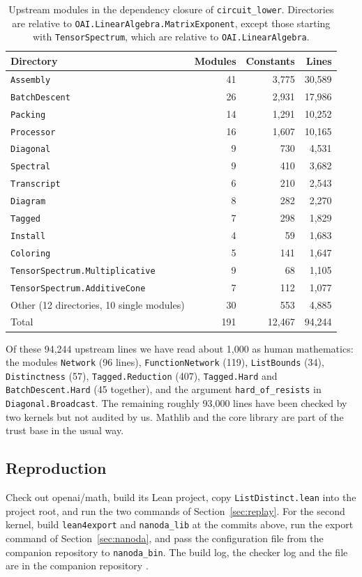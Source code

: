 \documentclass[11pt]{amsart}
\theoremstyle{definition}
\theoremstyle{remark}
\newcommand{\lean}[1]{\texttt{#1}}
\begin{document}
\begin{table}[h]
\small
\begin{tabular}{@{}lrrr@{}}
\toprule
Directory & Modules & Constants & Lines\\
\midrule
\lean{Assembly} & 41 & 3,775 & 30,589\\
\lean{BatchDescent} & 26 & 2,931 & 17,986\\
\lean{Packing} & 14 & 1,291 & 10,252\\
\lean{Processor} & 16 & 1,607 & 10,165\\
\lean{Diagonal} & 9 & 730 & 4,531\\
\lean{Spectral} & 9 & 410 & 3,682\\
\lean{Transcript} & 6 & 210 & 2,543\\
\lean{Diagram} & 8 & 282 & 2,270\\
\lean{Tagged} & 7 & 298 & 1,829\\
\lean{Install} & 4 & 59 & 1,683\\
\lean{Coloring} & 5 & 141 & 1,647\\
\lean{TensorSpectrum.Multiplicative} & 9 & 68 & 1,105\\
\lean{TensorSpectrum.AdditiveCone} & 7 & 112 & 1,077\\
Other (12 directories, 10 single modules) & 30 & 553 & 4,885\\
\midrule
Total & 191 & 12,467 & 94,244\\
\bottomrule
\end{tabular}
\caption{Upstream modules in the dependency closure of \lean{circuit\_lower}. Directories are relative to \lean{OAI.LinearAlgebra.MatrixExponent}, except those starting with \lean{TensorSpectrum}, which are relative to \lean{OAI.LinearAlgebra}.}\label{tab:trust}
\end{table}

Of these 94,244 upstream lines we have read about 1,000 as human mathematics: the modules \lean{Network} (96 lines), \lean{FunctionNetwork} (119), \lean{ListBounds} (34), \lean{Distinctness} (57), \lean{Tagged.Reduction} (407), \lean{Tagged.Hard} and \lean{BatchDescent.Hard} (45 together), and the argument \lean{hard\_of\_resists} in \lean{Diagonal.Broadcast}. The remaining roughly 93,000 lines have been checked by two kernels but not audited by us. Mathlib and the core library are part of the trust base in the usual way.

\subsection{Reproduction}
Check out openai/math, build its Lean project, copy \lean{ListDistinct.lean} into the project root, and run the two commands of Section~\ref{sec:replay}. For the second kernel, build \lean{lean4export} and \lean{nanoda\_lib} at the commits above, run the export command of Section~\ref{sec:nanoda}, and pass the configuration file from the companion repository to \lean{nanoda\_bin}. The build log, the checker log and the file are in the companion repository \cite{Companion}.
\end{document}
